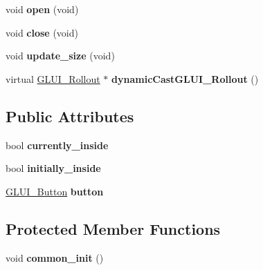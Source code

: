 \begin{DoxyCompactItemize}
\item 
\hypertarget{class_g_l_u_i___rollout_a431c2fee6adb56c18d0ed8ac9a01eacb}{void {\bfseries open} (void)}\label{class_g_l_u_i___rollout_a431c2fee6adb56c18d0ed8ac9a01eacb}

\item 
\hypertarget{class_g_l_u_i___rollout_a16ff61e6541e9872fc82f91c75263e16}{void {\bfseries close} (void)}\label{class_g_l_u_i___rollout_a16ff61e6541e9872fc82f91c75263e16}

\item 
\hypertarget{class_g_l_u_i___rollout_af6f664a8ca31757bc1e5926d5eaf2827}{void {\bfseries update\+\_\+size} (void)}\label{class_g_l_u_i___rollout_af6f664a8ca31757bc1e5926d5eaf2827}

\item 
\hypertarget{class_g_l_u_i___rollout_a046ff80c27aff4b9d51ae44693e0623b}{virtual \hyperlink{class_g_l_u_i___rollout}{G\+L\+U\+I\+\_\+\+Rollout} $\ast$ {\bfseries dynamic\+Cast\+G\+L\+U\+I\+\_\+\+Rollout} ()}\label{class_g_l_u_i___rollout_a046ff80c27aff4b9d51ae44693e0623b}

\end{DoxyCompactItemize}
\subsection*{Public Attributes}
\begin{DoxyCompactItemize}
\item 
\hypertarget{class_g_l_u_i___rollout_aa9896aa7e1ee76ac8b4d84573da7e6fb}{bool {\bfseries currently\+\_\+inside}}\label{class_g_l_u_i___rollout_aa9896aa7e1ee76ac8b4d84573da7e6fb}

\item 
\hypertarget{class_g_l_u_i___rollout_ad9d35f15e7df49dc27fdc5ab571e0e17}{bool {\bfseries initially\+\_\+inside}}\label{class_g_l_u_i___rollout_ad9d35f15e7df49dc27fdc5ab571e0e17}

\item 
\hypertarget{class_g_l_u_i___rollout_a552827a8d2ff58920457b8637b9536b0}{\hyperlink{class_g_l_u_i___button}{G\+L\+U\+I\+\_\+\+Button} {\bfseries button}}\label{class_g_l_u_i___rollout_a552827a8d2ff58920457b8637b9536b0}

\end{DoxyCompactItemize}
\subsection*{Protected Member Functions}
\begin{DoxyCompactItemize}
\item 
\hypertarget{class_g_l_u_i___rollout_aaf1aa792f0fd5a90822e13ecd2797736}{void {\bfseries common\+\_\+init} ()}\label{class_g_l_u_i___rollout_aaf1aa792f0fd5a90822e13ecd2797736}

\end{DoxyCompactItemize}

